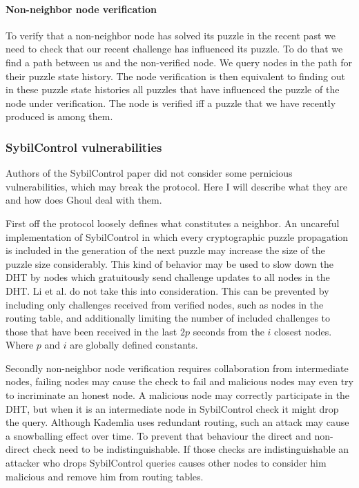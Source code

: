   \paragraph{Non-neighbor node verification}
  To verify that a non-neighbor node has solved its puzzle in the recent past we
  need to check that our recent challenge has influenced its puzzle. To do that
  we find a path between us and the non-verified node. We query nodes in the
  path for their puzzle state history. The node verification is then equivalent
  to finding out in these puzzle state histories all puzzles that have
  influenced the puzzle of the node under verification. The node is verified iff
  a puzzle that we have recently produced is among them.

\subsubsection{SybilControl vulnerabilities}
  Authors of the SybilControl paper did not consider some pernicious
  vulnerabilities, which may break the protocol. Here I will describe what they
  are and how does Ghoul deal with them.

  First off the protocol loosely defines what constitutes a neighbor. An
  uncareful implementation of SybilControl in which every cryptographic puzzle
  propagation is included in the generation of the next puzzle may increase the
  size of the puzzle size considerably. This kind of behavior may be used to
  slow down the DHT by nodes which gratuitously send challenge updates to all
  nodes in the DHT. Li et al. do not take this into consideration. This can
  be prevented by including only challenges received from verified nodes, such
  as nodes in the routing table, and additionally limiting the number of
  included challenges to those that have been received in the last $2p$ seconds
  from the $i$ closest nodes. Where $p$ and $i$ are globally defined constants.

  Secondly non-neighbor node verification requires collaboration from
  intermediate nodes, failing nodes may cause the check to fail and malicious
  nodes may even try to incriminate an honest node. A malicious node may
  correctly participate in the DHT, but when it is an intermediate node in
  SybilControl check it might drop the query. Although Kademlia uses redundant
  routing, such an attack may cause a snowballing effect over time. To prevent
  that behaviour the direct and non-direct check need to be indistinguishable.
  If those checks are indistinguishable an attacker who drops SybilControl
  queries causes other nodes to consider him malicious and remove him from
  routing tables.

